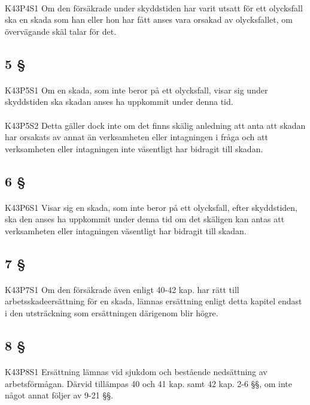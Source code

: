 \documentclass[a4paper,notitlepage,openany,10pt]{book}
\begin{document}
\paragraph*{}
{\tiny K43P4S1}
Om den försäkrade under skyddstiden har varit utsatt för ett olycksfall ska en skada som han eller hon har fått anses vara orsakad av olycksfallet, om övervägande skäl talar för det.
\subsection*{5 §}
\paragraph*{}
{\tiny K43P5S1}
Om en skada, som inte beror på ett olycksfall, visar sig under skyddstiden ska skadan anses ha uppkommit under denna tid.
\paragraph*{}
{\tiny K43P5S2}
Detta gäller dock inte om det finns skälig anledning att anta att skadan har orsakats av annat än verksamheten eller intagningen i fråga och att verksamheten eller intagningen inte väsentligt har bidragit till skadan.
\subsection*{6 §}
\paragraph*{}
{\tiny K43P6S1}
Visar sig en skada, som inte beror på ett olycksfall, efter skyddstiden, ska den anses ha uppkommit under denna tid om det skäligen kan antas att verksamheten eller intagningen väsentligt har bidragit till skadan.
\subsection*{7 §}
\paragraph*{}
{\tiny K43P7S1}
Om den försäkrade även enligt 40-42 kap. har rätt till arbetsskadeersättning för en skada, lämnas ersättning enligt detta kapitel endast i den utsträckning som ersättningen därigenom blir högre.
\subsection*{8 §}
\paragraph*{}
{\tiny K43P8S1}
Ersättning lämnas vid sjukdom och bestående nedsättning av arbetsförmågan. Därvid tillämpas 40 och 41 kap. samt 42 kap. 2-6 §§, om inte något annat följer av 9-21 §§.
\end{document}
